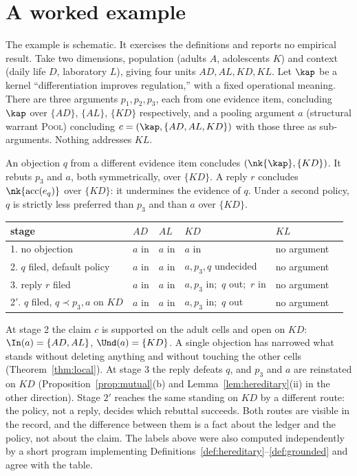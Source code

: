 \section{A worked example}\label{sec:worked7}

The example is schematic. It exercises the definitions and reports no empirical result. Take two dimensions, population (adults $A$, adolescents $K$) and context (daily life $D$, laboratory $L$), giving four units $AD,AL,KD,KL$. Let $\kap$ be a kernel ``differentiation improves regulation,'' with a fixed operational meaning. There are three arguments $p_1,p_2,p_3$, each from one evidence item, concluding $\kap$ over $\{AD\}$, $\{AL\}$, $\{KD\}$ respectively, and a pooling argument $a$ (structural warrant \textsc{Pool}) concluding $c=(\kap,\{AD,AL,KD\})$ with those three as sub-arguments. Nothing addresses $KL$.

An objection $q$ from a different evidence item concludes $(\nk{\kap},\{KD\})$. It rebuts $p_3$ and $a$, both symmetrically, over $\{KD\}$. A reply $r$ concludes $\nk{\mathrm{acc}(e_q)}$ over $\{KD\}$: it undermines the evidence of $q$. Under a second policy, $q$ is strictly less preferred than $p_3$ and than $a$ over $\{KD\}$.

\begin{center}
\begin{tabular}{@{}llllll@{}}
\toprule
stage & $AD$ & $AL$ & $KD$ & $KL$ & \\
\midrule
1. no objection & $a$ in & $a$ in & $a$ in & no argument &\\
2. $q$ filed, default policy & $a$ in & $a$ in & $a,p_3,q$ undecided & no argument &\\
3. reply $r$ filed & $a$ in & $a$ in & $a,p_3$ in;\ $q$ out;\ $r$ in & no argument &\\
2$'$. $q$ filed, $q\prec p_3,a$ on $KD$ & $a$ in & $a$ in & $a,p_3$ in;\ $q$ out & no argument &\\
\bottomrule
\end{tabular}
\end{center}

At stage 2 the claim $c$ is supported on the adult cells and open on $KD$: $\In(a)=\{AD,AL\}$, $\Und(a)=\{KD\}$. A single objection has narrowed what stands without deleting anything and without touching the other cells (Theorem~\ref{thm:local}). At stage 3 the reply defeats $q$, and $p_3$ and $a$ are reinstated on $KD$ (Proposition~\ref{prop:mutual}(b) and Lemma~\ref{lem:hereditary}(ii) in the other direction). Stage $2'$ reaches the same standing on $KD$ by a different route: the policy, not a reply, decides which rebuttal succeeds. Both routes are visible in the record, and the difference between them is a fact about the ledger and the policy, not about the claim. The labels above were also computed independently by a short program implementing Definitions~\ref{def:hereditary}--\ref{def:grounded} and agree with the table.
